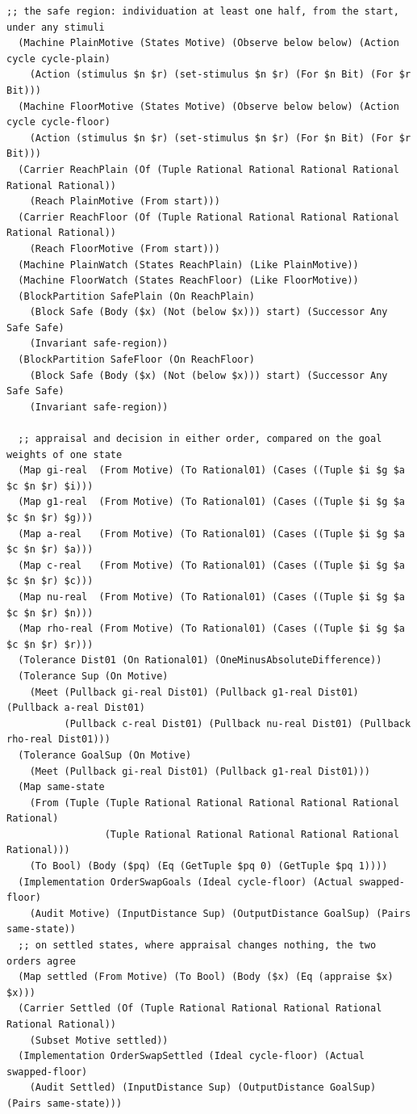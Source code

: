 \documentclass[11pt]{article}
\theoremstyle{definition}
\theoremstyle{plain}
\begin{document}
\begin{lstlisting}[style=mettamod]
  ;; the safe region: individuation at least one half, from the start, under any stimuli
  (Machine PlainMotive (States Motive) (Observe below below) (Action cycle cycle-plain)
    (Action (stimulus $n $r) (set-stimulus $n $r) (For $n Bit) (For $r Bit)))
  (Machine FloorMotive (States Motive) (Observe below below) (Action cycle cycle-floor)
    (Action (stimulus $n $r) (set-stimulus $n $r) (For $n Bit) (For $r Bit)))
  (Carrier ReachPlain (Of (Tuple Rational Rational Rational Rational Rational Rational))
    (Reach PlainMotive (From start)))
  (Carrier ReachFloor (Of (Tuple Rational Rational Rational Rational Rational Rational))
    (Reach FloorMotive (From start)))
  (Machine PlainWatch (States ReachPlain) (Like PlainMotive))
  (Machine FloorWatch (States ReachFloor) (Like FloorMotive))
  (BlockPartition SafePlain (On ReachPlain)
    (Block Safe (Body ($x) (Not (below $x))) start) (Successor Any Safe Safe)
    (Invariant safe-region))
  (BlockPartition SafeFloor (On ReachFloor)
    (Block Safe (Body ($x) (Not (below $x))) start) (Successor Any Safe Safe)
    (Invariant safe-region))

  ;; appraisal and decision in either order, compared on the goal weights of one state
  (Map gi-real  (From Motive) (To Rational01) (Cases ((Tuple $i $g $a $c $n $r) $i)))
  (Map g1-real  (From Motive) (To Rational01) (Cases ((Tuple $i $g $a $c $n $r) $g)))
  (Map a-real   (From Motive) (To Rational01) (Cases ((Tuple $i $g $a $c $n $r) $a)))
  (Map c-real   (From Motive) (To Rational01) (Cases ((Tuple $i $g $a $c $n $r) $c)))
  (Map nu-real  (From Motive) (To Rational01) (Cases ((Tuple $i $g $a $c $n $r) $n)))
  (Map rho-real (From Motive) (To Rational01) (Cases ((Tuple $i $g $a $c $n $r) $r)))
  (Tolerance Dist01 (On Rational01) (OneMinusAbsoluteDifference))
  (Tolerance Sup (On Motive)
    (Meet (Pullback gi-real Dist01) (Pullback g1-real Dist01) (Pullback a-real Dist01)
          (Pullback c-real Dist01) (Pullback nu-real Dist01) (Pullback rho-real Dist01)))
  (Tolerance GoalSup (On Motive)
    (Meet (Pullback gi-real Dist01) (Pullback g1-real Dist01)))
  (Map same-state
    (From (Tuple (Tuple Rational Rational Rational Rational Rational Rational)
                 (Tuple Rational Rational Rational Rational Rational Rational)))
    (To Bool) (Body ($pq) (Eq (GetTuple $pq 0) (GetTuple $pq 1))))
  (Implementation OrderSwapGoals (Ideal cycle-floor) (Actual swapped-floor)
    (Audit Motive) (InputDistance Sup) (OutputDistance GoalSup) (Pairs same-state))
  ;; on settled states, where appraisal changes nothing, the two orders agree
  (Map settled (From Motive) (To Bool) (Body ($x) (Eq (appraise $x) $x)))
  (Carrier Settled (Of (Tuple Rational Rational Rational Rational Rational Rational))
    (Subset Motive settled))
  (Implementation OrderSwapSettled (Ideal cycle-floor) (Actual swapped-floor)
    (Audit Settled) (InputDistance Sup) (OutputDistance GoalSup) (Pairs same-state)))


\end{lstlisting}
\end{document}
